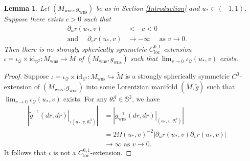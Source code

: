 \documentclass[10pt,a4paper]{amsart}
\newtheorem{lemma}{Lemma}
\newcommand{\Mw}{M_{\mathrm{wns}}}
\newcommand{\Q}{\mathcal{Q}}
\newcommand{\Sp}{\mathbb{S}}
\newcommand{\gw}{g_{\mathrm{wns}}}
\newcommand{\id}{\mathrm{id}}
\newcommand{\loc}{\mathrm{loc}}
\begin{document}
\begin{lemma}\label{lemma:SSSLip}
Let $(\Mw,\gw)$ be as in Section \ref{Introduction} and $u_*\in(-1,1)$. Suppose there exists $c>0$ such that
\begin{equation}\label{eqn:blowupassumptionLip}
    \begin{split}
      \partial_ur(u_*,v)&<-c<0\\
       \text{and }\quad        \partial_vr(u_*,v)&\to-\infty \quad \text{ as }v\to0.
    \end{split}
\end{equation}
Then there is no strongly spherically symmetric $C^{0,1}_{\loc}$-extension $\iota=\iota_{\Q}\times {\id}_{\Sp^2}:\Mw\to\tilde{M}$ of $(\Mw,\gw)$ such that $\lim_{v\to0}\iota_{\Q}(u_*,v)$ exists.
\end{lemma}

\begin{proof} 
    Suppose $\iota=\iota_{\Q}\times \text{id}_{\Sp^2}:\Mw\hookrightarrow\tilde{M}$ is a strongly spherically symmetric $C^0$-extension of $(\Mw,\gw)$ into some Lorentzian manifold $(\tilde{M},\tilde{g})$ such that $\lim_{v\to0}\iota_{\Q}(u_*,v)$ exists. For any $\theta_*^A\in\Sp^2$, we have
    \begin{equation}
        \begin{split}
           \left|\left.\tilde{g}^{-1}(d\tilde{r},d\tilde{r})\right\vert_{\iota(u_*,v,\theta^A_*)}\right|
           &=\left|\left.\gw^{-1}(dr,dr)\right\vert_{(u_*,v,\theta^A_*)}\right|\\
            &=2\Omega(u_*,v)^{-2}\left|\partial_ur(u_*,v)\partial_vr(u_*,v)\right|\\
            &\to\infty\text{ as }v\to0.
        \end{split}
    \end{equation}
It follows that $\iota$ is not a $C^{0,1}_{\loc}$-extension.
\end{proof}
\end{document}
